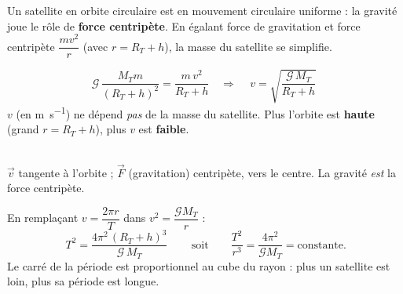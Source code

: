 \documentclass[11pt,a4paper]{article}
\newcommand{\vv}[1]{\vec{#1}}\newcommand{\ds}{\displaystyle}
\begin{document}

Un satellite en orbite circulaire est en mouvement circulaire uniforme : la gravité
joue le rôle de \textbf{force centripète}. En égalant force de gravitation et force
centripète $\dfrac{mv^2}{r}$ (avec $r=R_T+h$), la masse du satellite se simplifie.

\begin{cle}
\[
\mathcal{G}\,\frac{M_T m}{(R_T+h)^2}=\frac{m\,v^2}{R_T+h}
\quad\Longrightarrow\quad
\boxed{\,v=\sqrt{\dfrac{\mathcal{G}\,M_T}{R_T+h}}\,}
\]
$v$ (en \si{\metre\per\second}) ne dépend \emph{pas} de la masse du satellite. Plus
l'orbite est \textbf{haute} (grand $r=R_T+h$), plus $v$ est \textbf{faible}.
\end{cle}

\begin{center}
\\[-1pt]
{\footnotesize $\vv v$ tangente à l'orbite ; $\vv F$ (gravitation) centripète, vers le
centre. La gravité \emph{est} la force centripète.}
\end{center}

\begin{cle}
En remplaçant $v=\dfrac{2\pi r}{T}$ dans $v^2=\dfrac{\mathcal{G}M_T}{r}$ :
\[
\boxed{\,T^2=\dfrac{4\pi^2\,(R_T+h)^3}{\mathcal{G}\,M_T}\,}
\qquad\text{soit}\qquad \frac{T^2}{r^3}=\frac{4\pi^2}{\mathcal{G}M_T}=\text{constante}.
\]
Le carré de la période est proportionnel au cube du rayon : plus un satellite est
loin, plus sa période est longue.
\end{cle}
\end{document}
